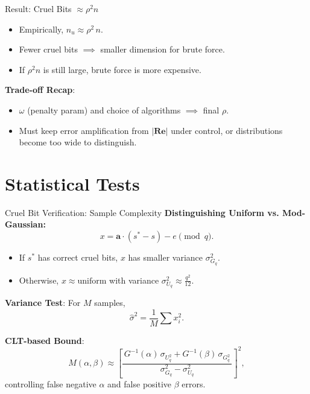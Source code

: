\documentclass{beamer}
\begin{document}
\begin{frame}{Result: Cruel Bits $\approx \rho^2 n$}
  \begin{itemize}
    \item Empirically, $n_u \approx \rho^2 \, n$.
    \item Fewer cruel bits $\implies$ smaller dimension for brute force.
    \item If $\rho^2 n$ is still large, brute force is more expensive.
  \end{itemize}

  \vspace{0.4cm}
  \textbf{Trade-off Recap}:
  \begin{itemize}
    \item $\omega$ (penalty param) and choice of algorithms $\implies$ final $\rho$.
    \item Must keep error amplification from $|\mathbf{R}\mathbf{e}|$ under control, or distributions become too wide to distinguish.
  \end{itemize}
\end{frame}

\section{Statistical Tests}
\begin{frame}{Cruel Bit Verification: Sample Complexity}
  \textbf{Distinguishing Uniform vs. Mod-Gaussian:}
  \[
    x = \mathbf{a}\cdot(s^* - s) - e \pmod{q}.
  \]
  \begin{itemize}
    \item If $s^*$ has correct cruel bits, $x$ has smaller variance $\sigma_{G_q}^2$.
    \item Otherwise, $x \approx \text{uniform}$ with variance $\sigma_{U_q}^2 \approx \frac{q^2}{12}\text{.}$  \end{itemize}

  \vspace{0.4cm}
  \textbf{Variance Test}:  
  For $M$ samples, 
  \[
    \hat{\sigma}^2 = \frac{1}{M}\sum x_i^2.
  \]

  \textbf{CLT-based Bound}:  
  \[
    M(\alpha, \beta) \approx
      \left[
        \frac{\,G^{-1}(\alpha)\,\sigma_{U_q^2} + G^{-1}(\beta)\,\sigma_{G_q^2}\,}
             {\sigma_{G_q}^2 - \sigma_{U_q}^2}
      \right]^2,
  \]
  controlling false negative $\alpha$ and false positive $\beta$ errors.
\end{frame}
\end{document}
